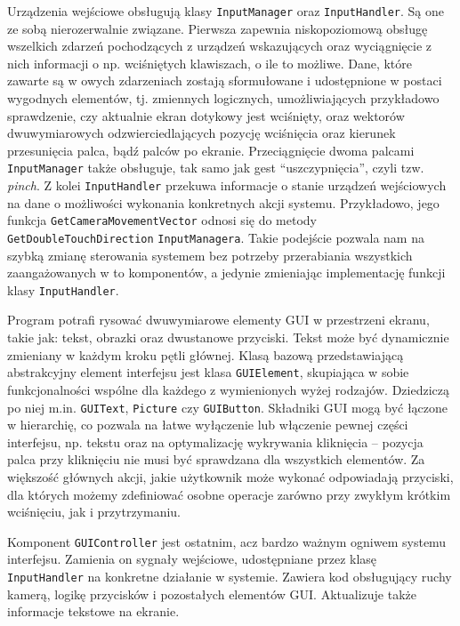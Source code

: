 		Urządzenia wejściowe obsługują klasy \texttt{InputManager} oraz \texttt{InputHandler}. Są one ze sobą nierozerwalnie związane. Pierwsza zapewnia niskopoziomową obsługę wszelkich zdarzeń pochodzących z urządzeń wskazujących oraz wyciągnięcie z nich informacji o np. wciśniętych klawiszach, o ile to możliwe. Dane, które zawarte są w owych zdarzeniach zostają sformułowane i udostępnione w postaci wygodnych elementów, tj. zmiennych logicznych, umożliwiających przykładowo sprawdzenie, czy aktualnie ekran dotykowy jest wciśnięty, oraz wektorów dwuwymiarowych odzwierciedlających pozycję wciśnięcia oraz kierunek przesunięcia palca, bądź palców po ekranie. Przeciągnięcie dwoma palcami \texttt{InputManager} także obsługuje, tak samo jak gest ``uszczypnięcia'', czyli tzw. \emph{pinch}. Z kolei \texttt{InputHandler} przekuwa informacje o stanie urządzeń wejściowych na dane o możliwości wykonania konkretnych akcji systemu. Przykładowo, jego funkcja \texttt{GetCameraMovementVector} odnosi się do metody \texttt{GetDoubleTouchDirection} \texttt{InputManagera}. Takie podejście pozwala nam na szybką zmianę sterowania systemem bez potrzeby przerabiania wszystkich zaangażowanych w to komponentów, a jedynie zmieniając implementację funkcji klasy \texttt{InputHandler}. 
		
		Program potrafi rysować dwuwymiarowe elementy GUI w przestrzeni ekranu, takie jak: tekst, obrazki oraz dwustanowe przyciski.
		Tekst może być dynamicznie zmieniany w każdym kroku pętli głównej. Klasą bazową przedstawiającą abstrakcyjny element interfejsu jest klasa \texttt{GUIElement}, skupiająca w sobie funkcjonalności wspólne dla każdego z wymienionych wyżej rodzajów. Dziedziczą po niej m.in. \texttt{GUIText}, \texttt{Picture} czy \texttt{GUIButton}. Składniki GUI mogą być łączone w hierarchię, co pozwala na łatwe wyłączenie lub włączenie pewnej części interfejsu, np. tekstu oraz na optymalizację wykrywania kliknięcia -- pozycja palca przy kliknięciu nie musi być sprawdzana dla wszystkich elementów. Za większość głównych akcji, jakie użytkownik może wykonać odpowiadają przyciski, dla których możemy zdefiniować osobne operacje zarówno przy zwykłym krótkim wciśnięciu, jak i przytrzymaniu.
		
		Komponent \texttt{GUIController} jest ostatnim, acz bardzo ważnym ogniwem systemu interfejsu. Zamienia on sygnały wejściowe, udostępniane przez klasę \texttt{InputHandler} na konkretne działanie w systemie. Zawiera kod obsługujący ruchy kamerą, logikę przycisków i pozostałych elementów GUI. Aktualizuje także informacje tekstowe na ekranie. 
		
